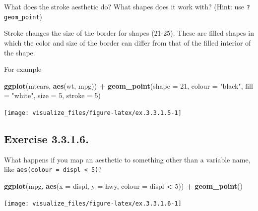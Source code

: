 \documentclass[]{book}
\newenvironment{Shaded}{\begin{snugshade}}{\end{snugshade}}
\newcommand{\DataTypeTok}[1]{\textcolor[rgb]{0.13,0.29,0.53}{#1}}
\newcommand{\DecValTok}[1]{\textcolor[rgb]{0.00,0.00,0.81}{#1}}
\newcommand{\KeywordTok}[1]{\textcolor[rgb]{0.13,0.29,0.53}{\textbf{#1}}}
\newcommand{\NormalTok}[1]{#1}
\newcommand{\OperatorTok}[1]{\textcolor[rgb]{0.81,0.36,0.00}{\textbf{#1}}}
\newcommand{\StringTok}[1]{\textcolor[rgb]{0.31,0.60,0.02}{#1}}
\theoremstyle{plain}
\theoremstyle{remark}
\begin{document}
What does the stroke aesthetic do? What shapes does it work with? (Hint: use \texttt{?geom\_point})

Stroke changes the size of the border for shapes (21-25).
These are filled shapes in which the color and size of the border can differ from that of the filled interior of the shape.

For example

\begin{Shaded}
\begin{Highlighting}[]
\KeywordTok{ggplot}\NormalTok{(mtcars, }\KeywordTok{aes}\NormalTok{(wt, mpg)) }\OperatorTok{+}
\StringTok{  }\KeywordTok{geom_point}\NormalTok{(}\DataTypeTok{shape =} \DecValTok{21}\NormalTok{, }\DataTypeTok{colour =} \StringTok{"black"}\NormalTok{, }\DataTypeTok{fill =} \StringTok{"white"}\NormalTok{, }\DataTypeTok{size =} \DecValTok{5}\NormalTok{, }\DataTypeTok{stroke =} \DecValTok{5}\NormalTok{)}
\end{Highlighting}
\end{Shaded}

\begin{center}\texttt{[image: visualize\_files/figure-latex/ex.3.3.1.5-1]} \end{center}

\hypertarget{exercise-3.3.1.6.}{%
\subsection*{\texorpdfstring{Exercise {3.3.1.6}.}{Exercise 3.3.1.6.}}\label{exercise-3.3.1.6.}}

What happens if you map an aesthetic to something other than a variable name, like \texttt{aes(colour\ =\ displ\ \textless{}\ 5)}?

\begin{Shaded}
\begin{Highlighting}[]
\KeywordTok{ggplot}\NormalTok{(mpg, }\KeywordTok{aes}\NormalTok{(}\DataTypeTok{x =}\NormalTok{ displ, }\DataTypeTok{y =}\NormalTok{ hwy, }\DataTypeTok{colour =}\NormalTok{ displ }\OperatorTok{<}\StringTok{ }\DecValTok{5}\NormalTok{)) }\OperatorTok{+}
\StringTok{  }\KeywordTok{geom_point}\NormalTok{()}
\end{Highlighting}
\end{Shaded}

\begin{center}\texttt{[image: visualize\_files/figure-latex/ex.3.3.1.6-1]} \end{center}
\end{document}
